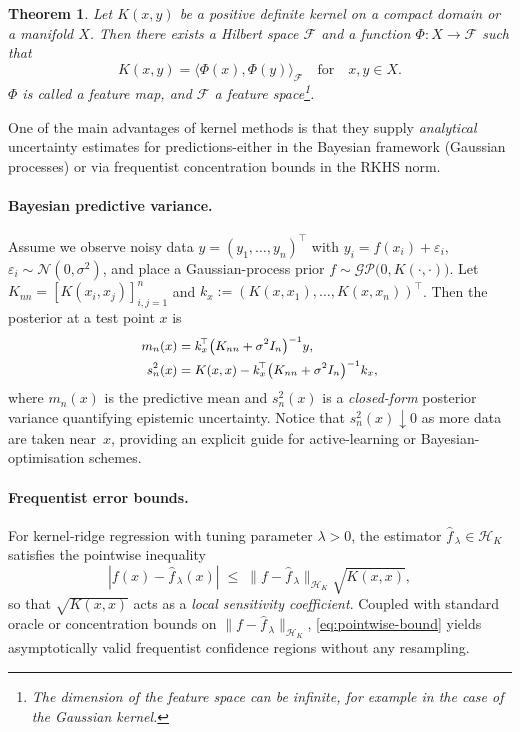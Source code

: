 \documentclass[11pt]{article}
\theoremstyle{plain}
\newtheorem{theorem}{Theorem}[section]
\def\[{\begin{equation}}
\def\]{\end{equation}}
\begin{document}
\begin{theorem}\label{thm4} \cite{aronszajn50reproducing}
 Let $K(x,y)$ be a positive definite kernel on a compact domain or a manifold $X$. Then there exists a Hilbert
space $\mathcal{F}$  and a function $\Phi: X \rightarrow \mathcal{F}$ such that
$$K(x,y)= \langle \Phi(x), \Phi(y) \rangle_{\mathcal{F}} \quad \mbox{for} \quad x,y \in X.$$
 $\Phi$ is called a feature map, and $\mathcal{F}$ a feature space\footnote{The dimension of the feature space can be infinite, for example in the case of the Gaussian kernel.}.
\end{theorem}

One of the main advantages of kernel methods is that they supply \emph{analytical}
uncertainty estimates for predictions-either in the Bayesian framework  (Gaussian
processes) or via frequentist concentration bounds in the RKHS norm.

\paragraph{Bayesian predictive variance.}
Assume we observe noisy data
$y=(y_1,\dots,y_n)^{\!\top}$ with
$y_i = f(x_i) + \varepsilon_i,$ $\varepsilon_i\sim\mathcal{N}(0,\sigma^{2})$,
and place a Gaussian-process prior
$f\sim\mathcal{GP}\!\bigl(0,K(\cdot,\cdot)\bigr)$.
Let $K_{nn}=[K(x_i,x_j)]_{i,j=1}^{n}$ and
$k_x:=(K(x,x_1),\dots,K(x,x_n))^{\!\top}$.
Then the posterior at a test point $x$ is
\[
\small
\begin{aligned}
m_n(x)      &= k_x^{\!\top}\bigl(K_{nn}+\sigma^{2}I_n\bigr)^{-1}y,\\
s_n^{2}(x) &= K(x,x)-k_x^{\!\top}\bigl(K_{nn}+\sigma^{2}I_n\bigr)^{-1}k_x,
\end{aligned}
\]
where $m_n(x)$ is the predictive mean
and $s_n^{2}(x)$ is a \emph{closed-form} posterior variance
quantifying epistemic uncertainty.  
Notice that $s_n^{2}(x)\!\downarrow\!0$ as more data are taken near~$x$,
providing an explicit guide for active-learning or Bayesian-optimisation schemes.

\paragraph{Frequentist error bounds.}
For kernel‐ridge regression with tuning parameter $\lambda>0$, the estimator
$\hat f_{\,\lambda}\in{\mathcal H}_{K}$ satisfies the pointwise inequality
\begin{equation}\label{eq:pointwise-bound}
  |f(x)-\hat f_{\,\lambda}(x)|
  \;\le\;
  \bigl\|f-\hat f_{\,\lambda}\bigr\|_{{\mathcal H}_{K}}
  \sqrt{K(x,x)},
\end{equation}
so that $\sqrt{K(x,x)}$ acts as a \emph{local sensitivity coefficient}.
Coupled with standard oracle or concentration bounds on
$\|f-\hat f_{\,\lambda}\|_{{\mathcal H}_{K}}$, \eqref{eq:pointwise-bound} yields
asymptotically valid frequentist confidence regions without any resampling.
 
\end{document}
